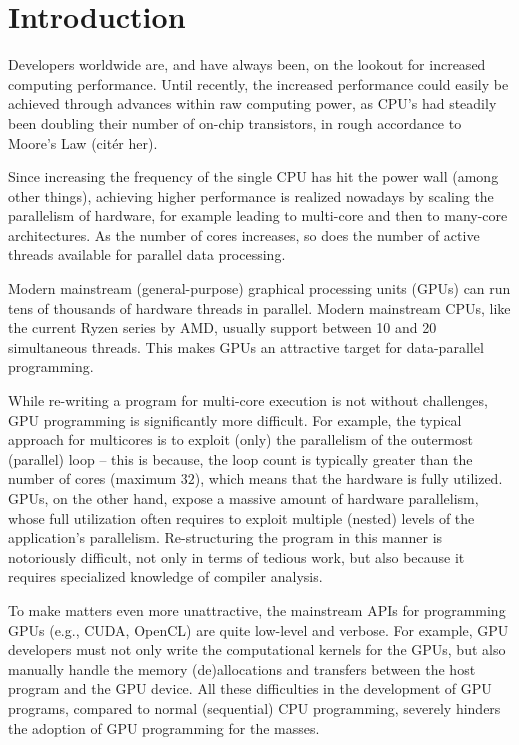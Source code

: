 \chapter{Introduction}

Developers worldwide are, and have always been, on the lookout 
for increased computing performance.
Until recently, the increased performance could easily be
achieved through advances within raw computing power, as CPU's had steadily been
doubling their number of on-chip transistors, in rough accordance to Moore's Law (citér
her).

Since increasing the frequency of the single CPU has hit the power
wall\cite{powerwall} (among other things), achieving higher performance 
is realized nowadays by scaling the parallelism of hardware, for example
leading to multi-core and then to many-core architectures.
As the number of cores increases, so does the number of
active threads available for parallel data processing.

Modern mainstream (general-purpose) graphical processing units (GPUs) can run 
tens of thousands of hardware threads in parallel. Modern mainstream CPUs, 
like the current Ryzen series by AMD, usually support between 10 and 20 
simultaneous threads. This makes GPUs an attractive target for data-parallel 
programming.

While re-writing a program for multi-core execution is not without challenges,
GPU programming is significantly more difficult. For example, the typical
approach for multicores is to exploit (only) the parallelism of the outermost
(parallel) loop -- this is because, the loop count is typically greater than 
the number of cores (maximum $32$), which means that the hardware
is fully utilized. GPUs, on the other hand, expose a massive amount of hardware
parallelism, whose full utilization often requires to exploit multiple (nested)
levels of the application's parallelism. Re-structuring the program in this
manner is notoriously difficult, not only in terms of tedious work, but also
because it requires specialized knowledge of compiler analysis.

To make matters even more unattractive, the mainstream APIs for programming
GPUs (e.g., CUDA, OpenCL) are quite low-level and verbose.  For example, GPU
developers must not only write the computational kernels for the GPUs, but 
also manually handle the memory (de)allocations and transfers between the host 
program and the GPU device.  All these difficulties in the development of GPU 
programs, compared to normal (sequential) CPU programming, severely hinders 
the adoption of GPU programming for the masses.

